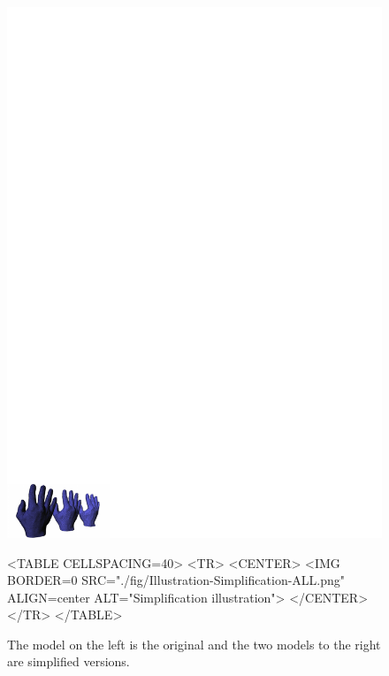 \begin{figure}[htbp]
\begin{ccTexOnly}
\begin{center}
\includegraphics{Surface_mesh_simplification/fig/Illustration-Simplification-ALL} %
\end{center}
\end{ccTexOnly}
\begin{ccHtmlOnly}
<TABLE CELLSPACING=40>
<TR>
<CENTER>
<IMG BORDER=0 SRC="./fig/Illustration-Simplification-ALL.png" ALIGN=center ALT="Simplification illustration">
</CENTER>
</TR>
</TABLE>
\end{ccHtmlOnly}
\caption{The model on the left is the original and the two models to the right are simplified versions.
\label{Valid-polygons}}
\end{figure}

